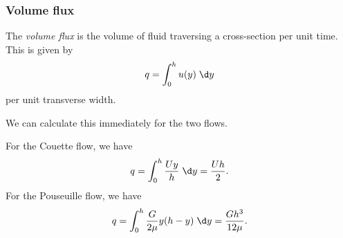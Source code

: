 \documentclass[a4paper]{article}
\begin{document}
\subsubsection{Volume flux}
\begin{defi}
  The \emph{volume flux} is the volume of fluid traversing a cross-section per unit time. This is given by
  \[
    q = \int_0^h u(y) \;\d y
  \]
  per unit transverse width.
\end{defi}
We can calculate this immediately for the two flows.

\begin{eg}
  For the Couette flow, we have
  \[
    q = \int_0^h \frac{Uy}{h}\;\d y = \frac{Uh}{2}.
  \]
  For the Pouseuille flow, we have
  \[
    q = \int_0^h \frac{G}{2\mu} y (h - y)\;\d y = \frac{Gh^3}{12 \mu}.
  \]
\end{eg}
\end{document}
